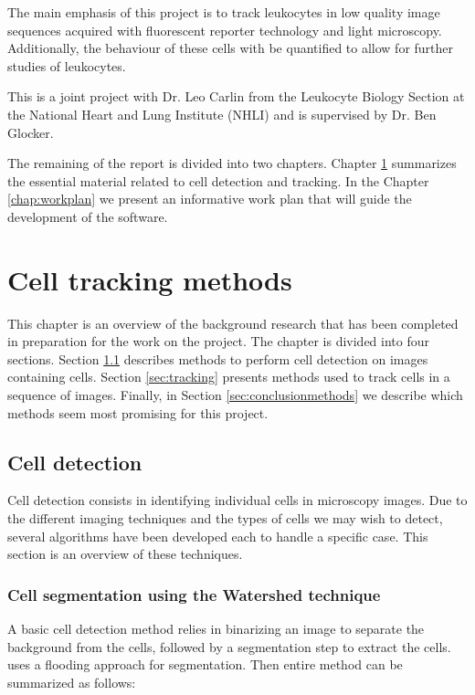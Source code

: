 \documentclass[12pt,a4paper,openany]{book}
\begin{document}
The main emphasis of this project is to track leukocytes in low quality image sequences acquired with fluorescent reporter technology and light microscopy. Additionally, the behaviour of these cells with be quantified to allow for further studies of leukocytes.

This is a joint project with Dr. Leo Carlin from the Leukocyte Biology Section at the National Heart and Lung Institute (NHLI) and is supervised by Dr. Ben Glocker.

The remaining of the report is divided into two chapters. Chapter \ref{chap:methodoverview} summarizes the essential material related to cell detection and tracking. In the Chapter \ref{chap:workplan} we present an informative work plan that will guide the development of the software. 



\chapter{Cell tracking methods}
\label{chap:methodoverview}

This chapter is an overview of the background research that has been completed in preparation for the work on the project. The chapter is divided into four sections. Section \ref{sec:detection} describes methods to perform cell detection on images containing cells. Section \ref{sec:tracking} presents methods used to track cells in a sequence of images. Finally, in Section \ref{sec:conclusionmethods} we describe which methods seem most promising for this project.


\section{Cell detection}
\label{sec:detection}

Cell detection consists in identifying individual cells in microscopy images. Due to the different imaging techniques and the types of cells we may wish to detect, several algorithms have been developed each to handle a specific case. This section is an overview of these techniques.

\subsection{Cell segmentation using the Watershed technique}

A basic cell detection method relies in binarizing an image to separate the background from the cells, followed by a segmentation step to extract the cells. \cite{chen99} uses a flooding approach for segmentation. Then entire method can be summarized as follows:
\end{document}

